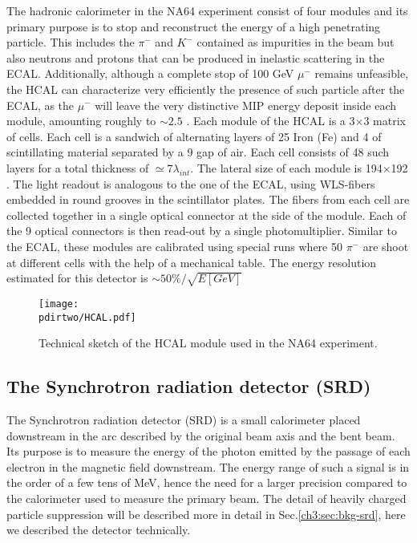 The hadronic calorimeter in the NA64 experiment consist of four modules and its primary purpose is to stop and reconstruct the energy of a high penetrating particle. This includes the $\pi^-$ and $K^-$ contained as impurities in the beam but also neutrons and protons that can be produced in inelastic scattering in the ECAL. Additionally, although a complete stop of 100 GeV $\mu^-$ remains unfeasible, the HCAL can characterize very efficiently the presence of such particle after the ECAL, as the $\mu^-$ will leave the very distinctive MIP energy deposit inside each module, amounting roughly to $\sim 2.5$ \gev. Each module of the HCAL is a 3$\times$3 matrix of cells. Each cell is a sandwich of alternating layers of 25 \mmi Iron (Fe) and 4 \mmi of scintillating material separated by a 9 \mmi gap of air. Each cell consists of 48 such layers for a total thickness of $\simeq 7\lambda_{int}$. The lateral size of each module is 194$\times$192 \mms. The light readout is analogous to the one of the ECAL, using WLS-fibers embedded in round grooves in the scintillator plates. The fibers from each cell are collected together in a single optical connector at the side of the module. Each of the 9 optical connectors is then read-out by a single photomultiplier. Similar to the ECAL, these modules are calibrated using special runs where 50 \gev $\pi^-$ are shoot at different cells with the help of a mechanical table. The energy resolution estimated for this detector is $\sim 50\%/\sqrt{E[GeV]}$

\begin{figure}[bth!]
\centering
\texttt{[image: \\pdirtwo/HCAL.pdf]}
\caption[HCAL sketch]{Technical sketch of the HCAL module used in the NA64 experiment.}
\label{fig:hcal-sketch}
\end{figure}

\subsection{The Synchrotron radiation detector (SRD)}
\label{ch2:sec:detectors-srd}

The Synchrotron radiation detector (SRD) is a small calorimeter placed downstream in the arc described by the original beam axis and the bent beam. Its purpose is to measure the energy of the photon emitted by the passage of each electron in the magnetic field downstream. The energy range of such a signal is in the order of a few tens of MeV, hence the need for a larger precision compared to the calorimeter used to measure the primary beam. The detail of heavily charged particle suppression will be described more in detail in Sec.\ref{ch3:sec:bkg-srd}, here we described the detector technically.

